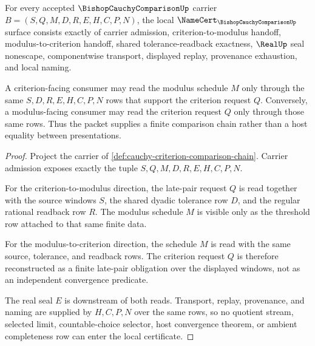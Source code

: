 \begin{theorem}
\label{thm:cauchy-criterion-comparison-chain-namecert-obligations}
For every accepted $\BishopCauchyComparisonUp$ carrier $B=(S,Q,M,D,R,E,H,C,P,N)$, the local $\NameCert_{\BishopCauchyComparisonUp}$ surface consists exactly of carrier admission, criterion-to-modulus handoff, modulus-to-criterion handoff, shared tolerance-readback exactness, $\RealUp$ seal nonescape, componentwise transport, displayed replay, provenance exhaustion, and local naming.

A criterion-facing consumer may read the modulus schedule $M$ only through the same $S,D,R,E,H,C,P,N$ rows that support the criterion request $Q$. Conversely, a modulus-facing consumer may read the criterion request $Q$ only through those same rows. Thus the packet supplies a finite comparison chain rather than a host equality between presentations.
\end{theorem}
\begin{proof}
Project the carrier of \autoref{def:cauchy-criterion-comparison-chain}. Carrier admission exposes exactly the tuple $S,Q,M,D,R,E,H,C,P,N$.

For the criterion-to-modulus direction, the late-pair request $Q$ is read together with the source windows $S$, the shared dyadic tolerance row $D$, and the regular rational readback row $R$. The modulus schedule $M$ is visible only as the threshold row attached to that same finite data.

For the modulus-to-criterion direction, the schedule $M$ is read with the same source, tolerance, and readback rows. The criterion request $Q$ is therefore reconstructed as a finite late-pair obligation over the displayed windows, not as an independent convergence predicate.

The real seal $E$ is downstream of both reads. Transport, replay, provenance, and naming are supplied by $H,C,P,N$ over the same rows, so no quotient stream, selected limit, countable-choice selector, host convergence theorem, or ambient completeness row can enter the local certificate.
\end{proof}

